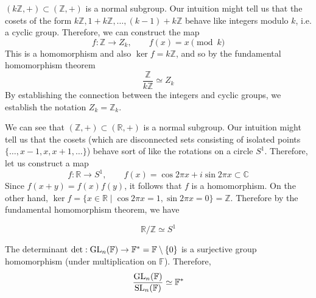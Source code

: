   \begin{example}
    $(k \mathbb{Z}, +) \subset (\mathbb{Z}, +)$ is a normal subgroup. Our intuition might tell us that the cosets of the form $k \mathbb{Z}, 1 + k \mathbb{Z}, \ldots, (k-1) + k\mathbb{Z}$ behave like integers modulo $k$, i.e. a cyclic group. Therefore, we can construct the map 
    \begin{equation}
      f: \mathbb{Z} \to Z_k, \qquad f(x) = x \pmod{k}
    \end{equation} 
    This is a homomorphism and also $\ker{f} = k \mathbb{Z}$, and so by the fundamental homomorphism theorem 
    \begin{equation}
      \frac{\mathbb{Z}}{k \mathbb{Z}} \simeq Z_k 
    \end{equation}
    By establishing the connection between the integers and cyclic groups, we establish the notation $Z_k = \mathbb{Z}_k$. 
  \end{example}

  \begin{example}
    We can see that $(\mathbb{Z}, +) \subset (\mathbb{R}, +)$ is a normal subgroup. Our intuition might tell us that the cosets (which are disconnected sets consisting of isolated points $\{\ldots, x - 1, x, x + 1, \ldots\}$) behave sort of like the rotations on a circle $S^1$. Therefore, let us construct a map 
    \begin{equation}
      f: \mathbb{R} \to S^1, \qquad f(x) = \cos{2\pi x} + i \sin{2\pi x} \subset \mathbb{C}
    \end{equation}
    Since $f(x + y) = f(x) f(y)$, it follows that $f$ is a homomorphism. On the other hand, $\ker{f} = \{ x \in \mathbb{R} \mid \cos{2 \pi x} = 1, \sin{2 \pi x} = 0 \} = \mathbb{Z}$. Therefore by the fundamental homomorphism theorem, we have
     
    \begin{equation}
      \mathbb{R}/\mathbb{Z} \simeq S^1
    \end{equation}
  \end{example}

  \begin{example}[Determinant]
    The determinant $\det: \operatorname{GL}_n (\mathbb{F}) \to \mathbb{F}^\ast = \mathbb{F} \setminus \{0\}$ is a surjective group homomorphism (under multiplication on $\mathbb{F}$). Therefore, 
    \begin{equation}
      \frac{\operatorname{GL}_n (\mathbb{F})}{\operatorname{SL}_n (\mathbb{F})} \simeq \mathbb{F}^\ast
    \end{equation}
  \end{example}

